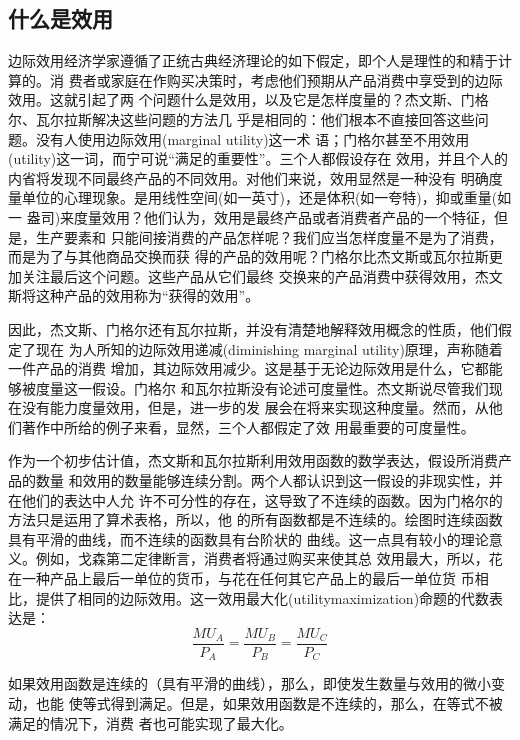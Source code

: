 \subsection{什么是效用}

边际效用经济学家遵循了正统古典经济理论的如下假定，即个人是理性的和精于计算的。消
费者或家庭在作购买决策时，考虑他们预期从产品消费中享受到的边际效用。这就引起了两
个问题什么是效用，以及它是怎样度量的？杰文斯、门格尔、瓦尔拉斯解决这些问题的方法几
乎是相同的：他们根本不直接回答这些问题。没有人使用边际效用(marginal utility)这一术
语；门格尔甚至不用效用(utility)这一词，而宁可说“满足的重要性”。三个人都假设存在
效用，并且个人的内省将发现不同最终产品的不同效用。对他们来说，效用显然是一种没有
明确度量单位的心理现象。是用线性空间(如一英寸)，还是体积(如一夸特)，抑或重量(如一
盎司)来度量效用？他们认为，效用是最终产品或者消费者产品的一个特征，但是，生产要素和
只能间接消费的产品怎样呢？我们应当怎样度量不是为了消费，而是为了与其他商品交换而获
得的产品的效用呢？门格尔比杰文斯或瓦尔拉斯更加关注最后这个问题。这些产品从它们最终
交换来的产品消费中获得效用，杰文斯将这种产品的效用称为“获得的效用”。

因此，杰文斯、门格尔还有瓦尔拉斯，并没有清楚地解释效用概念的性质，他们假定了现在
为人所知的边际效用递减(diminishing marginal utility)原理，声称随着一件产品的消费
增加，其边际效用减少。这是基于无论边际效用是什么，它都能够被度量这一假设。门格尔
和瓦尔拉斯没有论述可度量性。杰文斯说尽管我们现在没有能力度量效用，但是，进一步的发
展会在将来实现这种度量。然而，从他们著作中所给的例子来看，显然，三个人都假定了效
用最重要的可度量性。

作为一个初步估计值，杰文斯和瓦尔拉斯利用效用函数的数学表达，假设所消费产品的数量
和效用的数量能够连续分割。两个人都认识到这一假设的非现实性，并在他们的表达中人允
许不可分性的存在，这导致了不连续的函数。因为门格尔的方法只是运用了算术表格，所以，他
的所有函数都是不连续的。绘图时连续函数具有平滑的曲线，而不连续的函数具有台阶状的
曲线。这一点具有较小的理论意义。例如，戈森第二定律断言，消费者将通过购买来使其总
效用最大，所以，花在一种产品上最后一单位的货币，与花在任何其它产品上的最后一单位货
币相比，提供了相同的边际效用。这一效用最大化(utilitymaximization)命题的代数表达是：
\begin{equation*}
  \frac{MU_A}{P_A} = \frac{MU_B}{P_B} = \frac{MU_C}{P_C}
\end{equation*}

如果效用函数是连续的（具有平滑的曲线），那么，即使发生数量与效用的微小变动，也能
使等式得到满足。但是，如果效用函数是不连续的，那么，在等式不被满足的情况下，消费
者也可能实现了最大化。

